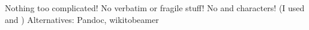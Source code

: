 \markdownRendererInterblockSeparator
{}\markdownRendererUlBegin
\markdownRendererUlItem Nothing too complicated!\markdownRendererUlItemEnd 
\markdownRendererUlItem No verbatim or fragile stuff!\markdownRendererUlItemEnd 
\markdownRendererUlItem No \texthash and \textunderscore{} characters!\markdownRendererUlItemEnd 
\markdownRendererUlItem (I used  and )\markdownRendererUlItemEnd 
\markdownRendererUlItem Alternatives: Pandoc, wikitobeamer\markdownRendererUlItemEnd 
\markdownRendererUlEnd \markdownRendererInterblockSeparator
{}\markdownRendererHorizontalRule{}\relax